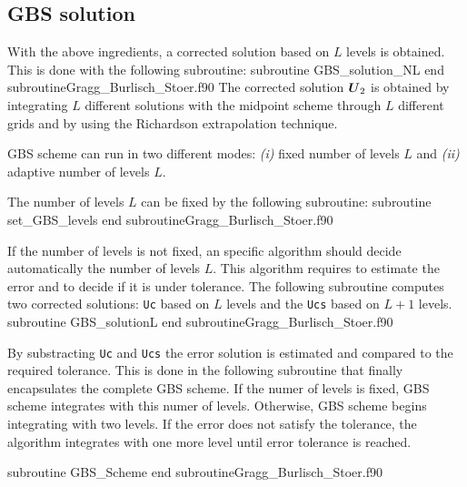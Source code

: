  
  
   
\newpage   
\subsection*{GBS solution}  
With the above ingredients, a corrected solution based on $ L $ levels is obtained. 
This is done with the following subroutine: 
 \vspace{0.5cm}
   {subroutine GBS_solution_NL}
   {end subroutine}{Gragg_Burlisch_Stoer.f90}
The corrected solution $ \boldsymbol{U}_2 $ is obtained by integrating $ L $ different solutions 
with the midpoint scheme through
$ L $ different grids and by using the Richardson extrapolation technique. 

GBS scheme can run in two different modes: {\it (i)} fixed number of levels $L$ and 
{\it (ii)} adaptive number of levels $L$. 

\newpage  
The number of levels $ L $ can be fixed by the following subroutine: 
 \vspace{0.5cm}
{subroutine set_GBS_levels}
{end subroutine}{Gragg_Burlisch_Stoer.f90}

If the number of levels is not fixed, 
an specific algorithm should decide automatically the number of levels $L$. 
This algorithm requires to estimate the error and to decide if it is under tolerance.
The following subroutine computes two corrected solutions: \verb|Uc|  based on $L $ levels 
and the \verb|Ucs| based on $ L+1$ levels.  
 \vspace{0.5cm}
  {subroutine GBS_solutionL}
  {end subroutine}{Gragg_Burlisch_Stoer.f90}
 


  
 \newpage
 By substracting \verb|Uc| and \verb|Ucs| the error solution is estimated and compared
 to the required tolerance. 
 This is done in the following subroutine that finally encapsulates the complete GBS scheme. 
 If the numer of levels is fixed, GBS scheme integrates with this numer of levels. 
 Otherwise, GBS scheme begins integrating with two levels. 
 If the error does not satisfy the tolerance, the algorithm integrates with  one more level until 
 error tolerance is reached. 
 
  \vspace{0.5cm}
{subroutine GBS_Scheme}
{end subroutine}{Gragg_Burlisch_Stoer.f90}

